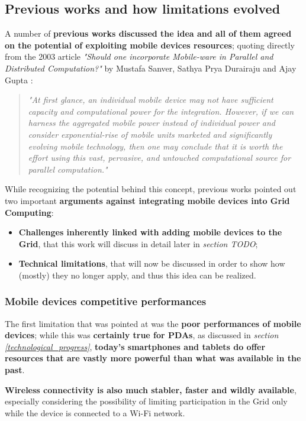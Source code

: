 \subsection{Previous works and how limitations evolved}
A number of \textbf{previous works discussed the idea and all of them agreed on the potential of exploiting mobile devices resources}; quoting directly from the 2003 article \textit{"Should one incorporate Mobile-ware in Parallel and Distributed Computation?"} by Mustafa Sanver, Sathya Prya Durairaju and Ajay Gupta \cite{should_one_incorporate_mobile_ware}:
\begin{quotation}
    \textit{"At first glance, an individual mobile device may not have sufficient capacity and computational power for the integration. However, if we can harness the aggregated mobile power instead of individual power and consider exponential-rise of mobile units marketed and significantly evolving mobile technology, then one may conclude that it is worth the effort using this vast, pervasive, and untouched computational source for parallel computation."}
\end{quotation}

While recognizing the potential behind this concept, previous works pointed out two important \textbf{arguments against integrating mobile devices into Grid Computing}:
\begin{itemize}
    \item \textbf{Challenges inherently linked with adding mobile devices to the Grid}, that this work will discuss in detail later in \textit{section TODO};
    \item \textbf{Technical limitations}, that will now be discussed in order to show how (mostly) they no longer apply, and thus this idea can be realized.
\end{itemize}

\subsubsection{Mobile devices competitive performances}
The first limitation that was pointed at was the \textbf{poor performances of mobile devices}; while this was \textbf{certainly true for PDAs}, as discussed in \textit{section \ref{technological_progress}}, \textbf{today's smartphones and tablets do offer resources that are vastly more powerful than what was available in the past}.

\textbf{Wireless connectivity is also much stabler, faster and wildly available}, especially considering the possibility of limiting participation in the Grid only while the device is connected to a Wi-Fi network.

